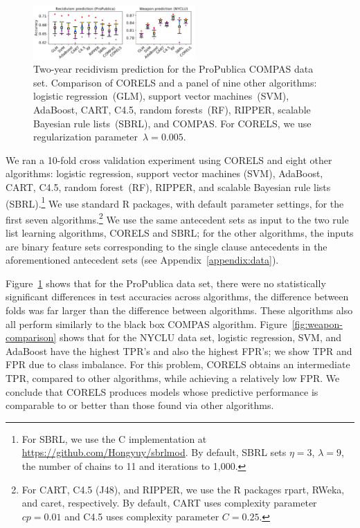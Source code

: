 \documentclass[twoside,11pt]{article}
\def\Reg{{\lambda}}
\begin{document}
\begin{figure}[t!]
\begin{center}
\includegraphics[trim={2mm, 0mm, 101mm, 0mm}, clip,
width=0.55\textwidth]{figs/compare-compas-weapon.pdf}
\vspace{-7mm}
\end{center}
\caption{Two-year recidivism prediction for the ProPublica COMPAS data set.
%
Comparison of CORELS and a panel of nine other algorithms:
logistic regression~(GLM), support vector machines~(SVM),
AdaBoost, CART, C4.5, random forests~(RF), RIPPER,
scalable Bayesian rule lists~(SBRL), and COMPAS.
%
For CORELS, we use regularization parameter~${\Reg=0.005}$.
}
\label{fig:compas-comparison}
\end{figure}

We ran a 10-fold cross validation experiment using CORELS
and eight other algorithms:
logistic regression, support vector machines (SVM), AdaBoost, CART, C4.5,
random forest~(RF), RIPPER, and scalable Bayesian rule lists (SBRL).\footnote{For
SBRL, we use the C implementation at \url{https://github.com/Hongyuy/sbrlmod}.
By default, SBRL sets ${\eta = 3}$, ${\lambda = 9}$,
the number of chains to 11 and iterations to 1,000.}
%
We use standard R packages, with default parameter settings,
for the first seven algorithms.\footnote{For CART, C4.5 (J48), and RIPPER,
we use the R packages rpart, RWeka, and caret, respectively.
%
By default, CART uses complexity parameter ${cp = 0.01}$ and C4.5 uses complexity parameter ${C = 0.25}$.
}
%
We use the same antecedent sets as input to the two rule list learning algorithms, CORELS and SBRL;
for the other algorithms, the inputs are binary feature sets corresponding to the
single clause antecedents in the aforementioned antecedent sets (see Appendix~\ref{appendix:data}).

Figure~\ref{fig:compas-comparison} shows that for the ProPublica data set,
there were no statistically significant differences in test accuracies across algorithms,
the difference between folds was far larger than the difference between algorithms.
%
These algorithms also all perform similarly to the black box COMPAS algorithm.
%
Figure~\ref{fig:weapon-comparison} shows that for the NYCLU data set,
logistic regression, SVM, and AdaBoost have the highest TPR's and also the highest FPR's;
we show TPR and FPR due to class imbalance.
%
For this problem, CORELS obtains an intermediate TPR, compared to other algorithms,
while achieving a relatively low FPR.
%
We conclude that CORELS produces models whose predictive performance is comparable to or better than
those found via other algorithms.
\end{document}
